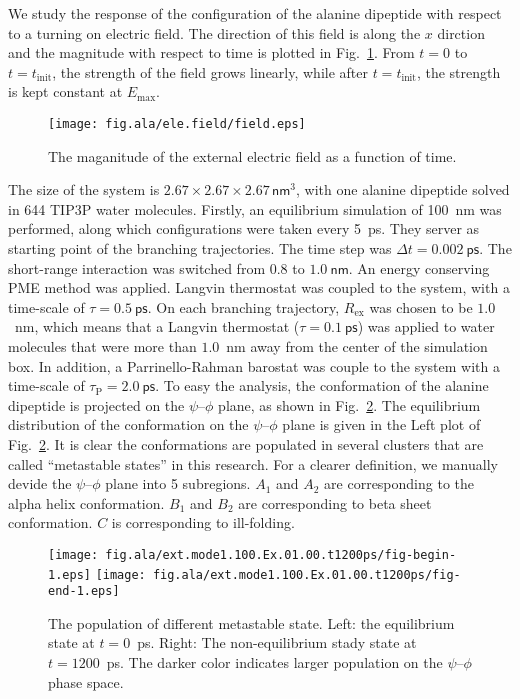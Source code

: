 \documentclass[aip,jcp,a4paper,reprint,onecolumn]{revtex4-1}
\begin{document}
We study the response of the configuration of the alanine dipeptide
with respect to a turning on electric field. The direction of this field
is along the $x$ dirction and the magnitude with respect to time is plotted
in Fig.~\ref{fig:tmp3}. From $t=0$ to $t=t_{\textrm{init}}$, the strength
of the field grows linearly, while after $t=t_{\textrm{init}}$, the strength
is kept constant at $E_{\textrm{max}}$. 
\begin{figure}
  \centering
  \texttt{[image: fig.ala/ele.field/field.eps]}
  \caption{The maganitude of the external electric field as
    a function of time.}
  \label{fig:tmp3}
\end{figure}
The size of the system is $2.67\times 2.67\times 2.67\,
\textsf{nm}^3$, with one alanine dipeptide solved in 644 TIP3P water
molecules. Firstly, an equilibrium simulation of 100~\textsf{nm} was
performed, along which configurations were taken every
5~\textsf{ps}. They server as starting point of the branching
trajectories. The time step was $\Delta t = 0.002~\textsf{ps}$. The
short-range interaction was switched from $0.8$ to $1.0~\textsf{nm}$.
An energy conserving PME method was applied. Langvin thermostat was
coupled to the system, with a time-scale of $\tau = 0.5~\textsf{ps}$.
On each branching trajectory, $R_{\textrm{ex}}$ was chosen to be
$1.0$~\textsf{nm}, which means that a Langvin thermostat ($\tau =
0.1~\textsf{ps}$) was applied to water molecules that were more than
$1.0$~\textsf{nm} away from the center of the simulation box. In
addition, a Parrinello-Rahman barostat was couple to the system with a
time-scale of $\tau_{\textrm{P}} = 2.0~\textsf{ps}$. To easy the
analysis, the conformation of the alanine dipeptide is projected on
the $\psi$--$\phi$ plane, as shown in Fig.~\ref{fig:tmp4}. The
equilibrium distribution of the conformation on the $\psi$--$\phi$
plane is given in the Left plot of Fig.~\ref{fig:tmp4}.  It is clear
the conformations are populated in several clusters that are called
``metastable states'' in this research. For a clearer definition, we
manually devide the $\psi$--$\phi$ plane into 5 subregions. $A_1$ and $A_2$ are
corresponding to the alpha helix conformation. $B_1$ and $B_2$ are corresponding
to beta sheet conformation. $C$ is corresponding to ill-folding.\\
\begin{figure}
  \centering
  \texttt{[image: fig.ala/ext.mode1.100.Ex.01.00.t1200ps/fig-begin-1.eps]}
  \texttt{[image: fig.ala/ext.mode1.100.Ex.01.00.t1200ps/fig-end-1.eps]}
  \caption{The population of different metastable state. Left: the equilibrium state at $t=0$~\textsf{ps}. Right: The non-equilibrium stady state at $t=1200$~\textsf{ps}. The darker color indicates larger population on the $\psi$--$\phi$ phase space.}
  \label{fig:tmp4}
\end{figure}
\end{document}
